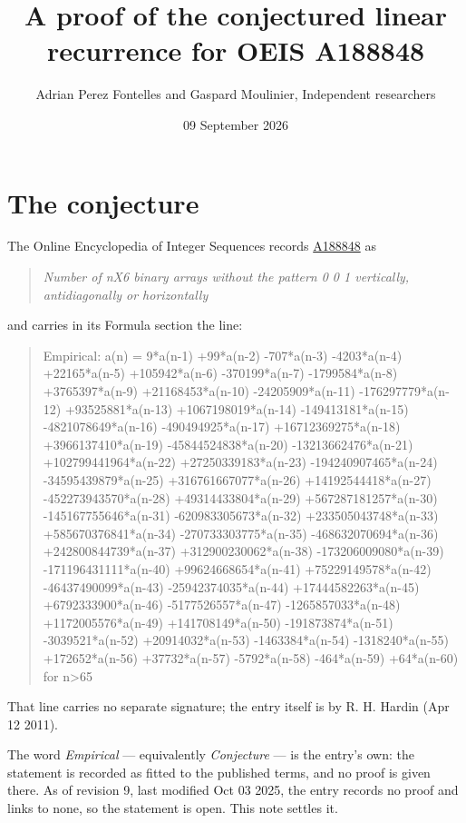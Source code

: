 \documentclass[11pt]{article}
\title{A proof of the conjectured linear recurrence for OEIS A188848}
\author{Adrian Perez Fontelles and Gaspard Moulinier, Independent researchers}
\date{09 September 2026}
\theoremstyle{definition}
\begin{document}
\maketitle
\section{The conjecture}

The Online Encyclopedia of Integer Sequences records \href{https://oeis.org/A188848}{A188848} as

\begin{quote}\itshape Number of nX6 binary arrays without the pattern 0 0 1 vertically, antidiagonally or horizontally\end{quote}

and carries in its Formula section the line:

\begin{quote}\ttfamily Empirical: a(n) = 9*a(n-1) +99*a(n-2) -707*a(n-3) -4203*a(n-4) +22165*a(n-5) +105942*a(n-6) -370199*a(n-7) -1799584*a(n-8) +3765397*a(n-9) +21168453*a(n-10) -24205909*a(n-11) -176297779*a(n-12) +93525881*a(n-13) +1067198019*a(n-14) -149413181*a(n-15) -4821078649*a(n-16) -490494925*a(n-17) +16712369275*a(n-18) +3966137410*a(n-19) -45844524838*a(n-20) -13213662476*a(n-21) +102799441964*a(n-22) +27250339183*a(n-23) -194240907465*a(n-24) -34595439879*a(n-25) +316761667077*a(n-26) +14192544418*a(n-27) -452273943570*a(n-28) +49314433804*a(n-29) +567287181257*a(n-30) -145167755646*a(n-31) -620983305673*a(n-32) +233505043748*a(n-33) +585670376841*a(n-34) -270733303775*a(n-35) -468632070694*a(n-36) +242800844739*a(n-37) +312900230062*a(n-38) -173206009080*a(n-39) -171196431111*a(n-40) +99624668654*a(n-41) +75229149578*a(n-42) -46437490099*a(n-43) -25942374035*a(n-44) +17444582263*a(n-45) +6792333900*a(n-46) -5177526557*a(n-47) -1265857033*a(n-48) +1172005576*a(n-49) +141708149*a(n-50) -191873874*a(n-51) -3039521*a(n-52) +20914032*a(n-53) -1463384*a(n-54) -1318240*a(n-55) +172652*a(n-56) +37732*a(n-57) -5792*a(n-58) -464*a(n-59) +64*a(n-60) for n>65\end{quote}

That line carries no separate signature; the entry itself is by R. H. Hardin (Apr 12 2011).

The word {\itshape Empirical} --- equivalently {\itshape Conjecture} --- is the entry's own: the statement is recorded as fitted to the published terms, and no proof is given there. As of revision 9, last modified Oct 03 2025, the entry records no proof and links to none, so the statement is open. This note settles it.
\end{document}
